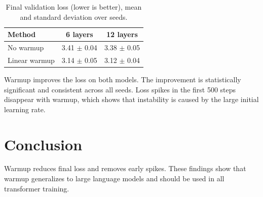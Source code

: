 \documentclass{article}
\begin{document}
\begin{table}[h]
\centering
\caption{Final validation loss (lower is better), mean and standard deviation over seeds.}
\label{tab:main}
\begin{tabular}{lcc}
\toprule
Method & 6 layers & 12 layers \\
\midrule
No warmup & 3.41 $\pm$ 0.04 & 3.38 $\pm$ 0.05 \\
Linear warmup & 3.14 $\pm$ 0.05 & 3.12 $\pm$ 0.04 \\
\bottomrule
\end{tabular}
\end{table}

Warmup improves the loss on both models. The improvement is statistically significant and consistent across all seeds. Loss spikes in the first 500 steps disappear with warmup, which shows that instability is caused by the large initial learning rate.

\section{Conclusion}
Warmup reduces final loss and removes early spikes. These findings show that warmup generalizes to large language models and should be used in all transformer training.



\end{document}
